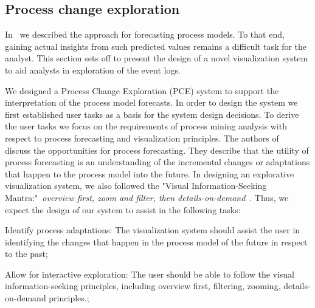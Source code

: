 \subsection{Process change exploration}\label{sec:3c:pce}




In~ we described the approach for forecasting process models. To that end, gaining actual insights from such predicted values remains a difficult task for the analyst. This section sets off to present the design of a novel visualization system to aid analysts in exploration of the event logs.

We designed a Process Change Exploration (PCE) system to support the interpretation of the process model forecasts. In order to design the system we first established user tasks as a basis for the system design decisions. To derive the user tasks we focus on the requirements of process mining analysis with respect to process forecasting and visualization principles. The authors of~\cite{DBLP:conf/bpm/PollPRRR18} discuss the opportunities for process forecasting. They describe that the utility of process forecasting is an understanding of the incremental changes or adaptations that happen to the process model into the future. In designing an explorative visualization system, we also followed the "Visual Information-Seeking Mantra:"~\emph{overview first, zoom and filter, then details-on-demand}~\cite{DBLP:conf/vl/Shneiderman96}. 
Thus, we expect the design of our system to assist in the following tasks:


\begin{requidescr}
	\item[Identify process adaptations:\namedlabel{req:adaptation}] The visualization system should assist the user in identifying the changes that happen in the process model of the future in respect to the past;
	\item[Allow for interactive exploration:\namedlabel{req:interactive}] The user should be able to follow the visual information-seeking principles, including overview first, filtering, zooming, details-on-demand principles.;
\end{requidescr} %

